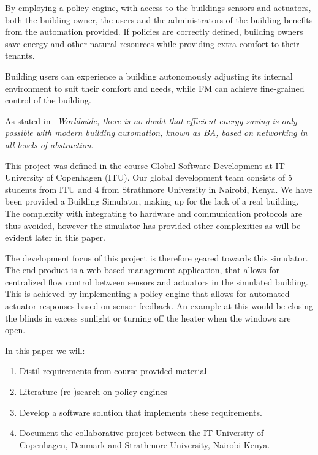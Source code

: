 
By employing a policy engine, with access to the buildings sensors and actuators, both the building owner, the users and the administrators of the building benefits from the automation provided. If policies are correctly defined, building owners save energy and other natural resources while providing extra comfort to their tenants. 

Building users can experience a building autonomously adjusting its internal environment to suit their comfort and needs, while FM can achieve fine-grained control of the building.

As stated in~\cite{ba-short} \textit{Worldwide, there is no doubt that efficient energy saving is only possible with modern building automation, known as BA, based on networking in all levels of abstraction}.

This project was defined in the course Global Software Development at IT University of Copenhagen (ITU). Our global development team consists of 5 students from ITU and 4 from Strathmore University in Nairobi, Kenya. We have been provided a Building Simulator, making up for the lack of a real building. The complexity with integrating to hardware and communication protocols are thus avoided, however the simulator has provided other complexities as will be evident later in this paper. 

The development focus of this project is therefore geared towards this simulator. The end product is a web-based management application, that allows for centralized flow control between sensors and actuators in the simulated building. This is achieved by implementing a policy engine that allows for automated actuator responses based on sensor feedback. An example at this would be closing the blinds in excess sunlight or turning off the heater when the windows are open.

In this paper we will: 
\begin{enumerate}
	\item Distil requirements from course provided material 
	\item Literature (re-)search on policy engines
	\item Develop a software solution that implements these requirements.
	\item Document the collaborative project between the IT University of Copenhagen, Denmark and Strathmore University, Nairobi Kenya.
\end{enumerate}

